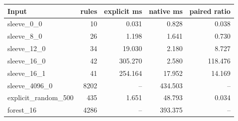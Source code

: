 \begin{center}
\begin{tabular}{@{}lrrrr@{}}
\toprule
Input & rules & explicit ms & native ms & paired ratio \\
\midrule
sleeve\_0\_0 & 10 & 0.031 & 0.828 & 0.038 \\
sleeve\_8\_0 & 26 & 1.198 & 1.641 & 0.730 \\
sleeve\_12\_0 & 34 & 19.030 & 2.180 & 8.727 \\
sleeve\_16\_0 & 42 & 305.270 & 2.580 & 118.476 \\
sleeve\_16\_1 & 41 & 254.164 & 17.952 & 14.169 \\
sleeve\_4096\_0 & 8202 & -- & 434.503 & -- \\
explicit\_random\_500 & 435 & 1.651 & 48.793 & 0.034 \\
forest\_16 & 4286 & -- & 393.375 & -- \\
\bottomrule
\end{tabular}
\end{center}
